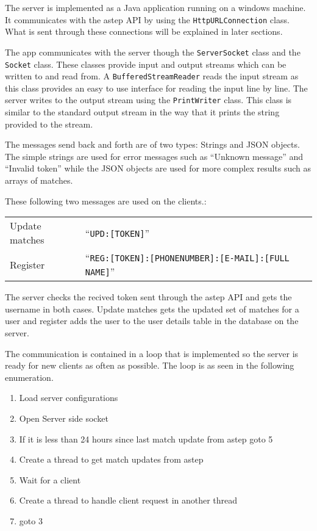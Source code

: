 The server is implemented as a Java application running on a windows machine.
It communicates with the \gls{astep} API by using the \texttt{HttpURLConnection} class.
What is sent through these connections will be explained in later sections.

The app communicates with the server though the \texttt{ServerSocket} class and the \texttt{Socket} class.
These classes provide input and output streams which can be written to and read from.
A \texttt{BufferedStreamReader} reads the input stream as this class provides an easy to use interface for reading the input line by line.
The server writes to the output stream using the \texttt{PrintWriter} class.
This class is similar to the standard output stream in the way that it prints the string provided to the stream.

The messages send back and forth are of two types: Strings and JSON objects.
The simple strings are used for error messages such as \enquote{Unknown message} and \enquote{Invalid token} while the JSON objects are used for more complex results such as arrays of matches.

These following two messages are used on the clients.:

{\centering
	\begin{tabular}{l l}
		Update matches & \enquote{\texttt{UPD:[TOKEN]}}\\
		Register & \enquote{\texttt{REG:[TOKEN]:[PHONENUMBER]:[E-MAIL]:[FULL NAME]}}
	\end{tabular}
}

The server checks the recived token sent through the \gls{astep} API and gets the username in both cases.
Update matches gets the updated set of matches for a user and register adds the user to the user details table in the database on the server.

The communication is contained in a loop that is implemented so the server is ready for new clients as often as possible.
The loop is as seen in the following enumeration.

\begin{enumerate}
	\item Load server configurations
	\item Open Server side socket
	\item If it is less than 24 hours since last match update from \gls{astep} goto 5
	\item Create a thread to get match updates from \gls{astep}
	\item Wait for a client
	\item Create a thread to handle client request in another thread
	\item goto 3
\end{enumerate}

